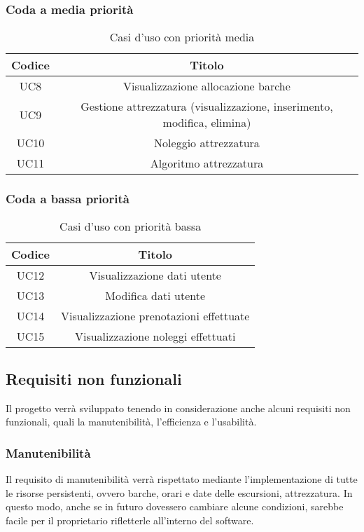 \subsubsection{Coda a media priorità}

\begin{table}[htbp]
 \centering
 \begin{tabular}{|c | c|} 
 \hline
 Codice & Titolo \\ [0.5ex] 
 \hline\hline
UC8 & Visualizzazione allocazione barche \\
\hline
UC9 & Gestione attrezzatura (visualizzazione, inserimento, modifica, elimina) \\
\hline
UC10 & Noleggio attrezzatura \\
\hline
UC11 & Algoritmo attrezzatura \\
\hline
\end{tabular}
\caption{Casi d'uso con priorità media}
\label{Casi d'uso con priorità media}
\end{table}

\subsubsection{Coda a bassa priorità}

\begin{table}[htbp]
 \centering
 \begin{tabular}{|c | c|} 
 \hline
 Codice & Titolo \\ [0.5ex] 
 \hline\hline
UC12 & Visualizzazione dati utente \\
\hline
UC13 & Modifica dati utente \\
\hline
UC14 & Visualizzazione prenotazioni effettuate \\
\hline
UC15 & Visualizzazione noleggi effettuati \\
\hline
\end{tabular}
\caption{Casi d'uso con priorità bassa}
\label{Casi d'uso con priorità bassa}
\end{table}

\clearpage

\subsection{Requisiti non funzionali}
Il progetto verrà sviluppato tenendo in considerazione anche alcuni requisiti non funzionali, quali la manutenibilità, l'efficienza e l'usabilità.
\subsubsection{Manutenibilità}
Il requisito di manutenibilità verrà rispettato mediante l'implementazione di tutte le risorse persistenti, ovvero barche, orari e date delle escursioni, attrezzatura. In questo modo, anche se in futuro dovessero cambiare alcune condizioni, sarebbe facile per il proprietario rifletterle all'interno del software.
